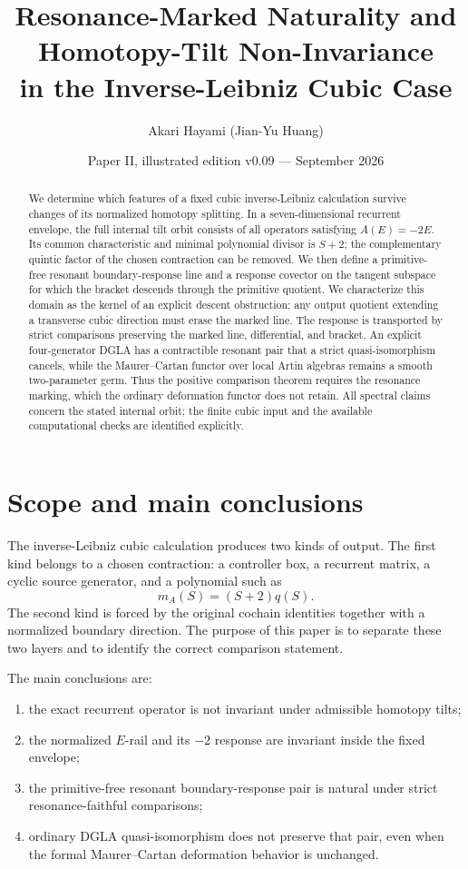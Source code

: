 \documentclass[11pt]{amsart}
\title[Resonance-Marked Naturality]{Resonance-Marked Naturality and Homotopy-Tilt Non-Invariance\\
in the Inverse-Leibniz Cubic Case}
\author{Akari Hayami (Jian-Yu Huang)}
\date{Paper II, illustrated edition v0.09 --- September 2026}
\begin{document}
\begin{abstract}
We determine which features of a fixed cubic inverse-Leibniz calculation survive changes
of its normalized homotopy splitting. In a seven-dimensional recurrent envelope,
the full internal tilt orbit consists of all operators satisfying $A(E)=-2E$.
Its common characteristic and minimal polynomial divisor is $S+2$; the complementary
quintic factor of the chosen contraction can be removed. We then define a primitive-free
resonant boundary-response line and a response covector on the tangent subspace for
which the bracket descends through the primitive quotient. We characterize this domain as the kernel of an explicit descent obstruction;
any output quotient extending a transverse cubic direction must erase the marked line. The response is transported by strict comparisons preserving the marked
line, differential, and bracket. An explicit four-generator DGLA has a contractible
resonant pair that a strict quasi-isomorphism cancels, while the Maurer--Cartan functor
over local Artin algebras remains a smooth two-parameter germ. Thus the positive
comparison theorem requires the resonance marking, which the ordinary deformation
functor does not retain. All spectral claims concern the stated internal orbit;
the finite cubic input and the available computational checks are identified explicitly.
\end{abstract}

\maketitle

\section{Scope and main conclusions}

The inverse-Leibniz cubic calculation produces two kinds of output.  The first kind belongs to a chosen contraction: a controller box, a recurrent matrix, a cyclic source generator, and a polynomial such as
\[
m_A(S)=(S+2)q(S).
\]
The second kind is forced by the original cochain identities together with a normalized boundary direction.  The purpose of this paper is to separate these two layers and to identify the correct comparison statement.

The main conclusions are:

\begin{enumerate}[label=(\roman*)]
\item the exact recurrent operator is not invariant under admissible homotopy tilts;
\item the normalized \(E\)-rail and its \(-2\) response are invariant inside the fixed envelope;
\item the primitive-free resonant boundary-response pair is natural under strict resonance-faithful comparisons;
\item ordinary DGLA quasi-isomorphism does not preserve that pair, even when the formal Maurer--Cartan deformation behavior is unchanged.
\end{enumerate}
\end{document}
